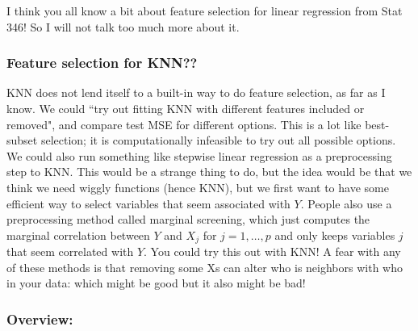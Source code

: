 I think you all know a bit about feature selection for linear regression from Stat 346! So I will not talk too much more about it.

\subsubsection{Feature selection for KNN??}

KNN does not lend itself to a built-in way to do feature selection, as far as I know. We could ``try out fitting KNN with different features included or removed", and compare test MSE for different options. This is a lot like best-subset selection; it is computationally infeasible to try out all possible options. We could also run something like stepwise linear regression as a preprocessing step to KNN. This would be a strange thing to do, but the idea would be that we think we need wiggly functions (hence KNN), but we first want to have some efficient way to select variables that seem associated with $Y$. People also use a preprocessing method called marginal screening, which just computes the marginal correlation between $Y$ and $X_j$ for $j=1,\ldots,p$ and only keeps variables $j$ that seem correlated with $Y$. You could try this out with KNN! A fear with any of these methods is that removing some Xs can alter who is neighbors with who in your data: which might be good but it also might be bad!

\subsubsection{Overview:}

